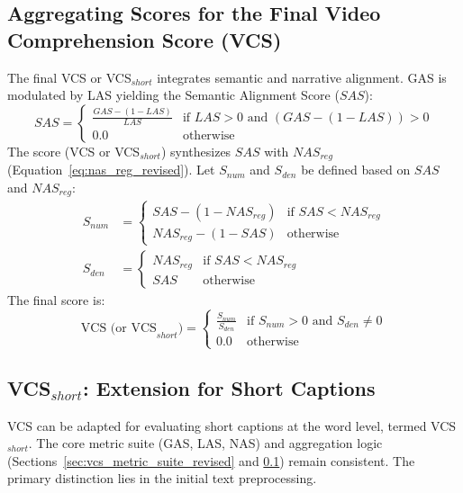 \documentclass[letterpaper]{article} %
\begin{document}
\subsection{Aggregating Scores for the Final Video Comprehension Score (VCS)}
\label{sec:aggregating_scores_revised}
The final VCS or VCS$_{short}$ integrates semantic and narrative alignment. GAS is modulated by LAS yielding the Semantic Alignment Score ($SAS$):
\begin{equation}
\label{eq:sas_revised}
SAS = 
\begin{cases}
\frac{GAS - (1 - LAS)}{LAS} & \text{if } LAS > 0 \text{ and } (GAS - (1 - LAS)) > 0 \\
0.0 & \text{otherwise}
\end{cases}
\end{equation}
The score (VCS or VCS$_{short}$) synthesizes $SAS$ with $NAS_{reg}$ (Equation~\ref{eq:nas_reg_revised}).
Let $S_{num}$ and $S_{den}$ be defined based on $SAS$ and $NAS_{reg}$:
\begin{align*}
S_{num} &= 
\begin{cases}
SAS - (1 - NAS_{reg}) & \text{if } SAS < NAS_{reg} \\
NAS_{reg} - (1 - SAS) & \text{otherwise}
\end{cases} \\
S_{den} &= 
\begin{cases}
NAS_{reg} & \text{if } SAS < NAS_{reg} \\
SAS & \text{otherwise}
\end{cases}
\end{align*}
The final score is:
\begin{equation}
\label{eq:vcs_revised}
\text{VCS (or VCS}_{short}\text{)} =
\begin{cases}
\frac{S_{num}}{S_{den}} & \text{if } S_{num} > 0 \text{ and } S_{den} \neq 0 \\
0.0 & \text{otherwise}
\end{cases}
\end{equation}

\subsection{VCS$_{short}$: Extension for Short Captions}
\label{sec:vcs_short}
VCS can be adapted for evaluating short captions at the word level, termed VCS$_{short}$. The core metric suite (GAS, LAS, NAS) and aggregation logic (Sections~\ref{sec:vcs_metric_suite_revised} and \ref{sec:aggregating_scores_revised}) remain consistent. The primary distinction lies in the initial text preprocessing.
\end{document}
